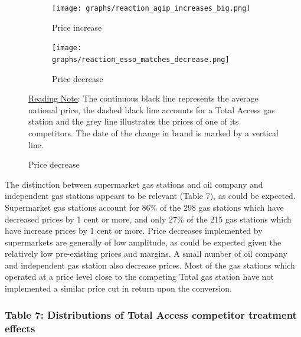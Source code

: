 \documentclass[english]{article}
\begin{document}
\begin{figure}[H]
\centering
\caption{Examples of price series of Total Access competitors}
\label{fig:price_dist_total_ba}
\begin{subfigure}[b]{\columnwidth}
\centering
\texttt{[image: graphs/reaction\_agip\_increases\_big.png]}
\caption[short]{Price increase}
\end{subfigure}
\begin{subfigure}[b]{\columnwidth}
\centering
\texttt{[image: graphs/reaction\_esso\_matches\_decrease.png]}
\caption[short]{Price decrease}
\end{subfigure}
\flushleft
{\small{}\uline{Reading Note}}{\small{}: } The continuous black line  represents the average national price, the dashed black line accounts for a Total Access gas station and the grey line illustrates the prices of one of its competitors. The date of the change in brand is marked by a vertical line. \medskip{}
\end{figure}

The distinction between supermarket gas stations and oil company and independent gas stations appears to be relevant (Table 7), as could be expected. Supermarket gas stations account for 86\% of the 298 gas stations which have decreased prices by 1 cent or more, and only 27\% of the 215 gas stations which have increase prices by 1 cent or more. Price decreases implemented by supermarkets are generally of low amplitude, as could be expected given the relatively low pre-existing prices and margins. A small number of oil company and independent gas station also decrease prices. Most of the gas stations which operated at a price level close to the competing Total gas station have not implemented a similar price cut in return upon 
the conversion. \medskip{}

\subsubsection*{Table 7: Distributions of Total Access competitor treatment effects}
\end{document}
